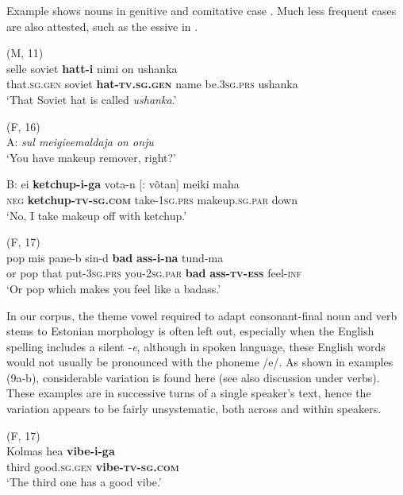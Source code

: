 \documentclass[output=paper]{langscibook}
\begin{document}
Example  shows nouns in genitive  and comitative case . Much less frequent cases are also attested, such as the essive in .

\ea%
    \label{ex:vihmanetal:8}
\ea  (M, 11)\\\label{ex:vihmanetal:8a}
\gll selle    soviet \textbf{{hatt-i}}     nimi  on ushanka\\
that.\textsc{sg.gen}   soviet \textbf{hat{}-}\textbf{\textsc{tv.sg.gen}}   name   be.3\textsc{sg.prs} ushanka\\
\glt ‘That Soviet hat is called \textit{ushanka}.’

\ex   (F, 16)\\\label{ex:vihmanetal:8b}
A:  \textit{sul meigieemaldaja on onju}\\
‘You have makeup remover, right?’

B:
\gll ei   \textbf{{ketchup-i-ga} }  {vota-n [: võtan]} meiki        maha\\
\textsc{neg}   \textbf{{ketchup{}-}\textsc{tv-sg.com}}   take{}-1\textsc{sg.prs} makeup.\textsc{sg.par}   down\\
\glt  ‘No, I take makeup off with ketchup.’

\ex   (F, 17)\\\label{ex:vihmanetal:8c}
   pop mis  pane-b   sin-d \textbf{bad} \textbf{ass-i-na}  tund-ma\\
or     pop that   put{}-3\textsc{sg.prs}   you{}-2\textsc{sg.par} \textbf{bad} \textbf{{ass}-\textsc{tv-ess}} feel-\textsc{inf}\\
\glt ‘Or pop which makes you feel like a badass.’
    \z
\z



In our corpus, the theme vowel required to adapt consonant-final noun and verb stems to Estonian morphology is often left out, especially when the English spelling includes a silent -\textit{e}, although in spoken language, these English words would not usually be pronounced with the phoneme /e/. As shown in examples (9a-b), considerable variation is found here (see also discussion under verbs). These examples are in successive turns of a single speaker’s text, hence the variation appears to be fairly unsystematic, both across and within speakers.

\ea%
    \label{ex:vihmanetal:9}
\ea   (F, 17)\\ \label{ex:vihmanetal:9a}
\gll Kolmas    hea    \textbf{{vibe-i-ga}}\\
third    good.\textsc{sg.gen}  \textbf{vibe\textsc{{}-tv-sg.com}}\\
\glt ‘The third one has a good vibe.’
\end{document}
